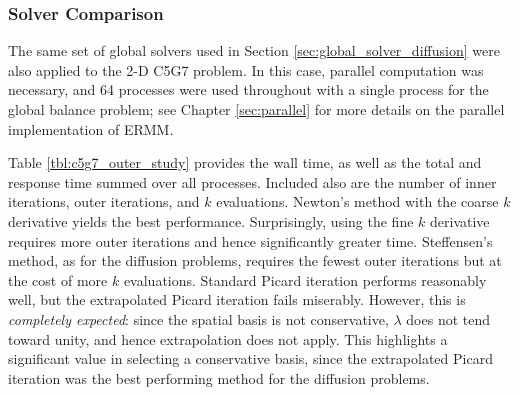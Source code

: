 \subsubsection{Solver Comparison}

The same set of global solvers used in 
Section \ref{sec:global_solver_diffusion} were also applied 
to the 2-D C5G7 problem.  In this case, parallel computation 
was necessary, and 64 processes were used throughout with a 
single process for the global balance problem; see 
Chapter \ref{sec:parallel} for more details on the parallel
implementation of ERMM.

Table \ref{tbl:c5g7_outer_study} provides the wall time,
as well as the total and response time summed over all 
processes.  Included also are the number of inner iterations,
outer iterations, and $k$ evaluations.  Newton's method with the 
coarse $k$ derivative yields the best performance.  Surprisingly,
using the fine $k$ derivative requires more outer iterations and 
hence significantly greater time.  Steffensen's method, as for the 
diffusion problems, requires the fewest outer iterations but at the 
cost of more $k$ evaluations.  Standard Picard iteration 
performs reasonably well, but the extrapolated Picard iteration
fails miserably.  However, this is {\it completely expected}: since 
the spatial basis is not conservative,  $\lambda$ does not 
tend toward unity, and hence extrapolation does not apply.  This 
highlights a significant value in selecting a conservative basis, 
since the extrapolated Picard iteration was the best performing 
method for the diffusion problems.


